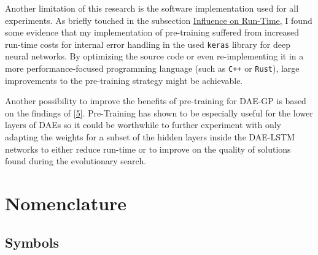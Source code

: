 \documentclass[
  11pt,
]{article}
\begin{document}
Another limitation of this research is the software implementation used for all experiments.
As briefly touched in the subsection \protect\hyperlink{influence-on-run-time}{Influence on Run-Time}, I found some evidence that my implementation of pre-training suffered from increased run-time costs for internal error handling in the used \texttt{keras} library for deep neural networks.
By optimizing the source code or even re-implementing it in a more performance-focused programming language (such as \texttt{C++} or \texttt{Rust}), large improvements to the pre-training strategy might be achievable.

Another possibility to improve the benefits of pre-training for DAE-GP is based on the findings of {[}\protect\hyperlink{ref-pmlr-v5-erhan09a}{5}{]}.
Pre-Training has shown to be especially useful for the lower layers of DAEs so it could be worthwhile to further experiment with only adapting the weights for a subset of the hidden layers inside the DAE-LSTM networks to either reduce run-time or to improve on the quality of solutions found during the evolutionary search.

\newpage

\hypertarget{II}{%
\section*{Nomenclature}\label{II}}

\hypertarget{IIa}{%
\subsection*{Symbols}\label{IIa}}
\end{document}
